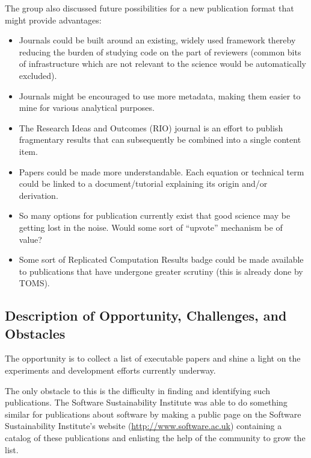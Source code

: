The group also discussed future possibilities for a new publication format
that might provide advantages:
\begin{itemize}

\item Journals could be built around an existing, widely used framework thereby
reducing the burden of studying code on the part of reviewers (common bits of
infrastructure which are not relevant to the science would be automatically
excluded).

\item Journals might be encouraged to use more metadata, making them easier to
mine for various analytical purposes.

\item The Research Ideas and Outcomes (RIO) journal is an effort to publish fragmentary results that can subsequently be
combined into a single content item.

\item Papers could be made more understandable. Each equation or technical term
could be linked to a document/tutorial explaining its origin and/or
derivation.

\item So many options for publication currently exist that good science may be
getting lost in the noise. Would some sort of ``upvote'' mechanism be of value?

\item Some sort of Replicated Computation Results badge could be made available
to publications that have undergone greater scrutiny (this is already done by
TOMS).
  
\end{itemize}

\subsection{Description of Opportunity, Challenges, and Obstacles}

The opportunity is to collect a list of executable papers and shine a
light on the experiments and development efforts currently underway.

The only obstacle to this is the difficulty in finding and identifying such
publications. The Software Sustainability Institute was able to do something
similar for publications about software by making a public page on the Software
Sustainability Institute's website (\url{http://www.software.ac.uk}) containing a
catalog of these publications and enlisting the help of the community to grow
the list. 


